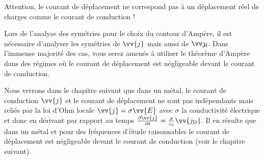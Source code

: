 \documentclass[12pt,fancy]{cours}
\begin{document}
\begin{remarque}
  Attention, le courant de déplacement ne correspond pas à un déplacement réel de charges comme le courant de conduction !
\end{remarque}
Lors de l'analyse des symétries pour le choix du contour d'Ampère, il est nécessaire d'analyser les symétries de $\vv{j}$ mais aussi de $\jd$. Dans l'immense majorité des cas, vous serez amenés à utiliser le théorème d'Ampère dans des régimes où le courant de déplacement est négligeable devant le courant de conduction.

\begin{remarque}
Nous verrons dans le chapitre suivant que dans un métal, le courant de conduction $\vv{j}$ et le courant de déplacement ne sont pas indépendants mais reliés par la loi d'Ohm locale $\vv{j}=\sigma\vv{E}$ avec $\sigma$ la conductivité électrique et donc en dérivant par rapport au temps $\frac{\partial \vv{j}}{\partial t}=\frac{\sigma}{\varepsilon_0}\vv{j_{\rm{D}}}$. Il en résulte que dans un métal et pour des fréquences d'étude raisonnables le courant de déplacement est négligeable devant le courant de conduction (voir le chapitre suivant).
\end{remarque}
\end{document}
